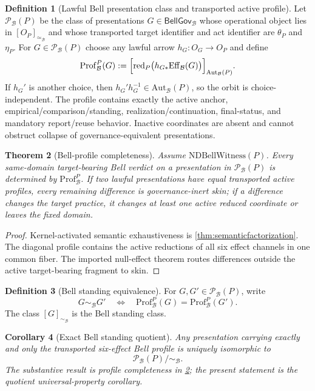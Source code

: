 \documentclass[11pt]{article}
\newtheorem{theorem}{Theorem}[section]
\newtheorem{corollary}[theorem]{Corollary}
\theoremstyle{definition}
\newtheorem{definition}[theorem]{Definition}
\newcommand{\Bell}{\mathcal{B}}
\newcommand{\NDBell}{\mathrm{NDBellWitness}}
\newcommand{\BellProf}{\mathrm{Prof}_{\Bell}}
\newcommand{\BellEq}{\simeq_{\Bell}}
\newcommand{\AutBell}{\mathrm{Aut}_{\Bell}(P)}
\newcommand{\BellGov}{\mathsf{BellGov}_{\Bell}}
\newcommand{\GovEff}{\mathrm{Eff}_{\Bell}}
\newcommand{\ActRed}{\operatorname{red}_{P}}
\begin{document}
\begin{definition}[Lawful Bell presentation class and transported active profile]\label{def:bellprofile}
Let $\mathcal P_{\Bell}(P)$ be the class of presentations $G\in\BellGov$ whose operational object lies in $[O_P]_{\BellEq}$ and whose transported target identifier and act identifier are $\theta_P$ and $\eta_P$. For $G\in\mathcal P_{\Bell}(P)$ choose any lawful arrow $h_G:O_G\to O_P$ and define
\[
\BellProf^{P}(G):=
\Bigl[\ActRed\bigl(h_{G*}\GovEff(G)\bigr)\Bigr]_{\AutBell}.
\]
If $h_G'$ is another choice, then $h_G'h_G^{-1}\in\AutBell$, so the orbit is choice-independent. The profile contains exactly the active anchor, empirical/comparison/standing, realization/continuation, final-status, and mandatory report/reuse behavior. Inactive coordinates are absent and cannot obstruct collapse of governance-equivalent presentations.
\end{definition}

\begin{theorem}[Bell-profile completeness]\label{thm:bellprofilecomplete}
Assume $\NDBell(P)$. Every same-domain target-bearing Bell verdict on a presentation in $\mathcal P_{\Bell}(P)$ is determined by $\BellProf^{P}$. If two lawful presentations have equal transported active profiles, every remaining difference is governance-inert skin; if a difference changes the target practice, it changes at least one active reduced coordinate or leaves the fixed domain.
\end{theorem}
\begin{proof}
Kernel-activated semantic exhaustiveness is \cref{thm:semanticfactorization}. The diagonal profile contains the active reductions of all six effect channels in one common fiber. The imported null-effect theorem routes differences outside the active target-bearing fragment to skin.
\end{proof}

\begin{definition}[Bell standing equivalence]\label{def:bellequiv}
For $G,G'\in\mathcal P_{\Bell}(P)$, write
\[
G\sim_{\Bell}G'\quad\Longleftrightarrow\quad\BellProf^{P}(G)=\BellProf^{P}(G').
\]
The class $[G]_{\sim_{\Bell}}$ is the Bell standing class.
\end{definition}

\begin{corollary}[Exact Bell standing quotient]\label{thm:bellquotient}
Any presentation carrying exactly and only the transported six-effect Bell profile is uniquely isomorphic to
\[
\mathcal P_{\Bell}(P)/\!\sim_{\Bell}.
\]
The substantive result is profile completeness in \cref{thm:bellprofilecomplete}; the present statement is the quotient universal-property corollary.
\end{corollary}
\end{document}
